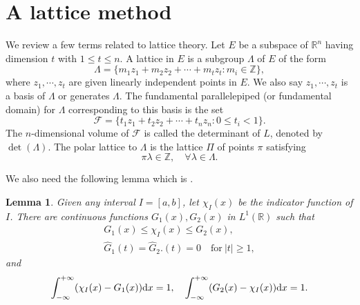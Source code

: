 \documentclass[12pt, reqno, twoside, letterpaper]{amsart}
\numberwithin{equation}{section}
\newcommand{\cF}{\ensuremath{\mathcal{F}}}
\newcommand{\RR}{\ensuremath{\mathbb{R}}}
\newcommand{\ZZ}{\ensuremath{\mathbb{Z}}}
\theoremstyle{customthm}
\newtheorem{lemma}[X]{Lemma}
\theoremstyle{customrem}
\newtheorem{definition}[X]{Definition}
\def\int{\intop\nolimits}
\begin{document}
\section{A lattice method}\label{subsection: polar Lattice}

We review a few terms related to lattice theory. Let $E$ be a subspace of $\RR^n$ having dimension $t$ with $1\leqslant t\leqslant n$. A lattice in $E$ is a subgroup $\Lambda$ of $E$ of the form
$$
\Lambda = \{ m_1z_1 + m_2z_2 + \cdots + m_tz_t : m_i\in \ZZ \},
$$
where $z_1,\cdots,z_t$ are given linearly independent points in $E$. We also say $z_1,\cdots,z_t$ is a basis of $\Lambda$ or generates $\Lambda$. The fundamental parallelepiped (or fundamental domain) for $\Lambda$ corresponding to this basis is the set
$$
\cF = \{ t_1z_1 + t_2z_2 + \cdots + t_nz_n : 0\leqslant t_i < 1 \}.
$$
The $n$-dimensional volume of $\cF$ is called the determinant of $L$, denoted by $\det(\Lambda)$. The polar lattice to $\Lambda$ is the lattice $\Pi$ of points $\pi$ satisfying
$$
\pi \lambda \in \ZZ, \quad \forall \lambda \in \Lambda.
$$





We also need the following lemma which is \cite[Lemma~2.4]{Baker1986}.


\begin{lemma}
	\label{lem:fourier analysis}
	Given any interval $I=[a,b]$, let $\chi_I(x)$ be the indicator function of $I$. There are continuous functions $G_1(x), G_2(x)$ in $L^1(\RR)$ such that
	\begin{align*}
		G_1(x) \leqslant \chi_I(x) \leqslant G_2(x), \\
		\hat{G}_1(t)=\hat{G}_2.(t)=0 \quad \text{for}\ |t|\geqslant 1,
	\end{align*}
	and
	\begin{align*}
		\int_{-\infty}^{+\infty}(\chi_I(x)-G_1(x))\textup{d}x = 1, \quad \int_{-\infty}^{+\infty}(G_2(x)-\chi_I(x))\textup{d}x = 1.
	\end{align*}
\end{lemma}
\end{document}
